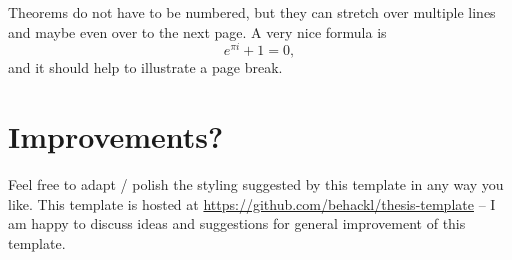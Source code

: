 \documentclass[11pt, twoside, withdegree]{bhthesis}
\begin{document}
\begin{theorem*}
  Theorems do not have to be numbered, but they can stretch over
  multiple lines and maybe even over to the next page. A very nice
  formula is
  \[ e^{\pi i} + 1 = 0, \]
  and it should help to illustrate a page break.
\end{theorem*}

\section{Improvements?}

Feel free to adapt / polish the styling suggested by this template
in any way you like. This template is hosted at
\url{https://github.com/behackl/thesis-template} -- I am happy to
discuss ideas and suggestions for general improvement of this template.
\end{document}

